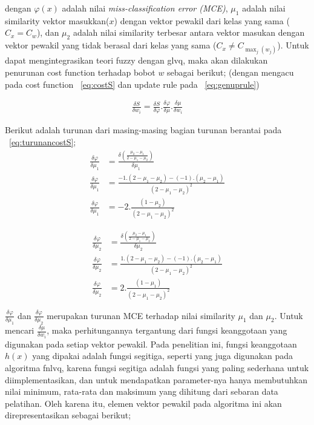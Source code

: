 dengan $\varphi(x)$ adalah nilai \emph{miss-classification error (MCE)},
$\mu_1$ adalah nilai similarity vektor masukkan($x$) dengan vektor pewakil dari
kelas yang sama ($C_x = C_w$), dan $\mu_2$ adalah nilai similarity
terbesar antara vektor masukan dengan vektor pewakil yang tidak berasal dari
kelas yang sama ($C_x \neq C_{\max_{j}(w_j)}$).  Untuk dapat mengintegrasikan
teori fuzzy dengan \gls{glvq}, maka akan dilakukan penurunan  cost function
terhadap bobot $w$ sebagai berikut; (dengan mengacu pada cost function
\equ~\ref{eq:costS} dan update rule pada \equ~\ref{eq:genuprule})

\begin{align}
\label{eq:turunancostS}
	\frac{\delta S}{\delta w_i} =  
	\frac{\delta S}{\delta \varphi} . \frac{\delta \varphi}{\delta \mu}.
	\frac{\delta \mu}{\delta w_i}
\end{align}


\noindent Berikut adalah turunan dari masing-masing bagian turunan berantai pada
\equ~\ref{eq:turunancostS}; 
\begin{align}
\label{eq:turunanmce1}
	\frac{\delta \varphi}{\delta \mu_1} &= 
	\frac{\delta \left(\frac{\mu_2-\mu_1}{2-\mu_1-\mu_2}\right)}{\delta \mu_1} 
	\nonumber \\ \frac{\delta \varphi}{\delta \mu_1} &=  
	\frac{-1 . (2 - \mu_1 - \mu_2) - (-1).(\mu_2-\mu_1)}
	{(2 - \mu_1 - \mu_2)^2} \nonumber \\
	\frac{\delta \varphi}{\delta \mu_1} &=  
	-2.\frac{(1 - \mu_2)}{(2 - \mu_1 - \mu_2)^2}
\end{align}

\begin{align}
\label{eq:turunanmce2}
	\frac{\delta \varphi}{\delta \mu_2} &= 
	\frac{\delta \left(\frac{\mu_2-\mu_1}{2-\mu_1-\mu_2}\right)}{\delta \mu_2} 
	\nonumber \\ \frac{\delta \varphi}{\delta \mu_2} &=  
	\frac{1 . (2 - \mu_1 - \mu_2) - (-1).(\mu_2-\mu_1)}
	{(2 - \mu_1 - \mu_2)^2} \nonumber \\
	\frac{\delta \varphi}{\delta \mu_2} &=  
	2.\frac{(1 - \mu_1)}{(2 - \mu_1 - \mu_2)^2}
\end{align}

$\frac{\delta \varphi}{\delta \mu_1}$ dan $\frac{\delta \varphi}{\delta
\mu_2}$ merupakan turunan MCE terhadap nilai similarity $\mu_1$ dan $\mu_2$.
Untuk mencari $\frac{\delta \mu}{\delta w_i}$, maka perhitungannya tergantung
dari fungsi keanggotaan yang digunakan pada setiap vektor pewakil. Pada
penelitian ini, fungsi keanggotaan $h(x)$ yang dipakai adalah fungsi segitiga,
seperti yang juga digunakan pada algoritma \gls{fnlvq}, karena fungsi segitiga adalah
fungsi yang paling sederhana untuk diimplementasikan, dan untuk mendapatkan
parameter-nya hanya membutuhkan nilai minimum, rata-rata dan maksimum yang
dihitung dari sebaran data pelatihan. Oleh karena itu, elemen vektor pewakil
pada algoritma ini akan direpresentasikan sebagai berikut;

